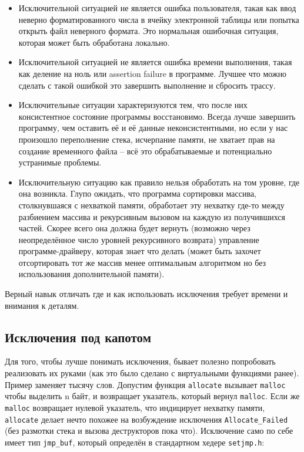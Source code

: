 \documentclass[a4paper,12pt,oneside]{article}
\begin{document}
\begin{itemize}
\item
Исключительной ситуацией не является ошибка пользователя, такая как ввод неверно форматированного числа в ячейку электронной таблицы или попытка открыть файл неверного формата. Это нормальная ошибочная ситуация, которая может быть обработана локально.
\item
Исключительной ситуацией не является ошибка времени выполнения, такая как деление на ноль или assertion failure в программе. Лучшее что можно сделать с такой ошибкой это завершить выполнение и сбросить трассу.
\item
Исключительные ситуации характеризуются тем, что после них консистентное состояние программы восстановимо. Всегда лучше завершить программу, чем оставить её и её данные неконсистентными, но если у нас произошло переполнение стека, исчерпание памяти, не хватает прав на создание временного файла -- всё это обрабатываемые и потенциально устранимые проблемы.
\item
Исключительную ситуацию как правило нельзя обработать на том уровне, где она возникла. Глупо ожидать, что программа сортировки массива, столкнувшаяся с нехваткой памяти, обработает эту нехватку где-то между разбиением массива и рекурсивным вызовом на каждую из получившихся частей. Скорее всего она должна будет вернуть (возможно через неопределённое число уровней рекурсивного возврата) управление программе-драйверу, которая знает что делать (может быть захочет отсортировать тот же массив менее оптимальным алгоритмом но без использования дополнительной памяти).
\end{itemize}

Верный навык отличать где и как использовать исключения требует времени и внимания к деталям.

\subsection{Исключения под капотом}

Для того, чтобы лучше понимать исключения, бывает полезно попробовать реализовать их руками (как это было сделано с виртуальными функциями ранее). Пример заменяет тысячу слов. Допустим функция \lstinline!allocate! вызывает \lstinline!malloc! чтобы выделить n байт, и возвращает указатель, который вернул \lstinline!malloc!. Если же \lstinline!malloc! возвращает нулевой указатель, что индицирует нехватку памяти, \lstinline!allocate! делает нечто похожее на возбуждение исключения \lstinline!Allocate_Failed! (без размотки стека и вызова деструкторов пока что). Исключение само по себе имеет тип \lstinline!jmp_buf!, который определён в стандартном хедере \lstinline!setjmp.h!:
\end{document}
